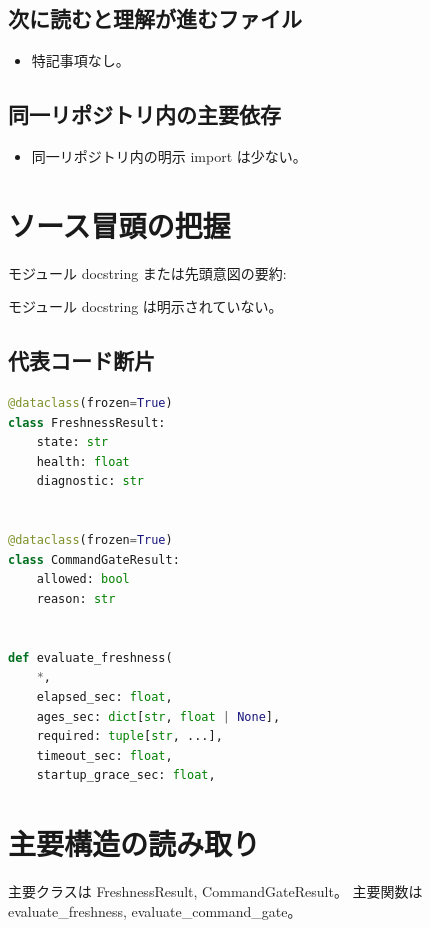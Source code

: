 \documentclass[a4paper,11pt]{article}
\begin{document}
        \subsection*{次に読むと理解が進むファイル}
        \begin{itemize}[leftmargin=1.6em]
        \item 特記事項なし。
        \end{itemize}

        \subsection*{同一リポジトリ内の主要依存}
        \begin{itemize}[leftmargin=1.6em]
        \item 同一リポジトリ内の明示 import は少ない。
        \end{itemize}

        \section*{ソース冒頭の把握}
        モジュール docstring または先頭意図の要約:

        モジュール docstring は明示されていない。

        \subsection*{代表コード断片}
        \begin{lstlisting}[language=Python]
@dataclass(frozen=True)
class FreshnessResult:
    state: str
    health: float
    diagnostic: str


@dataclass(frozen=True)
class CommandGateResult:
    allowed: bool
    reason: str


def evaluate_freshness(
    *,
    elapsed_sec: float,
    ages_sec: dict[str, float | None],
    required: tuple[str, ...],
    timeout_sec: float,
    startup_grace_sec: float,
\end{lstlisting}


        \section*{主要構造の読み取り}
        主要クラスは FreshnessResult, CommandGateResult。 主要関数は evaluate\_freshness, evaluate\_command\_gate。
\end{document}

